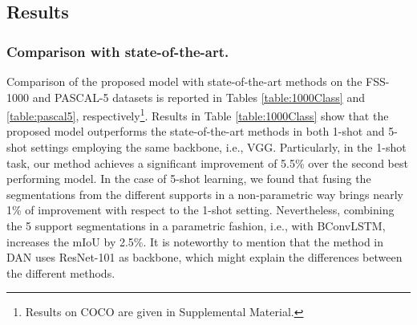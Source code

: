 \documentclass[runningheads]{llncs}
\begin{document}
\subsection{Results}



\subsubsection{Comparison with state-of-the-art.}
Comparison of the proposed model with state-of-the-art methods on the FSS-1000 and PASCAL-5 datasets is reported in Tables \ref{table:1000Class} and \ref{table:pascal5}, respectively\footnote{Results on COCO are given in Supplemental Material.}. Results in Table \ref{table:1000Class} show that the proposed model outperforms the state-of-the-art methods in both 1-shot and 5-shot settings employing the same backbone, i.e., VGG. Particularly, in the 1-shot task, our method achieves a significant improvement of 5.5\% over the second best performing model. In the case of 5-shot learning, we found that fusing the segmentations from the different supports in a non-parametric way brings nearly 1\% of improvement with respect to the 1-shot setting. Nevertheless, combining the 5 support segmentations in a parametric fashion, i.e., with BConvLSTM, increases the mIoU by 2.5\%. It is noteworthy to mention that the method in DAN \cite{wangfew} uses ResNet-101 as backbone, which might explain the differences between the different methods. 
\end{document}
